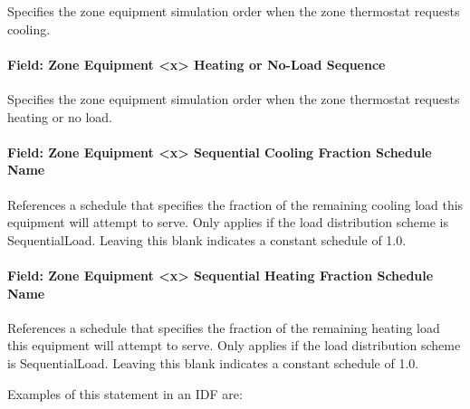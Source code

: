 Specifies the zone equipment simulation order when the zone thermostat requests cooling.

\paragraph{Field: Zone Equipment \textless{}x\textgreater{} Heating or No-Load Sequence}\label{field-zone-equipment-x-heating-or-no-load-sequence}

Specifies the zone equipment simulation order when the zone thermostat requests heating or no load.

\paragraph{Field: Zone Equipment \textless{}x\textgreater{} Sequential Cooling Fraction Schedule Name}\label{field-zone-equipment-x-sequential-cooling-fraction}

References a schedule that specifies the fraction of the remaining cooling load this equipment will attempt to serve. Only applies if the load distribution scheme is SequentialLoad. Leaving this blank indicates a constant schedule of 1.0.

\paragraph{Field: Zone Equipment \textless{}x\textgreater{} Sequential Heating Fraction Schedule Name}\label{field-zone-equipment-x-sequential-heating-fraction}

References a schedule that specifies the fraction of the remaining heating load this equipment will attempt to serve. Only applies if the load distribution scheme is SequentialLoad. Leaving this blank indicates a constant schedule of 1.0.

Examples of this statement in an IDF are:

